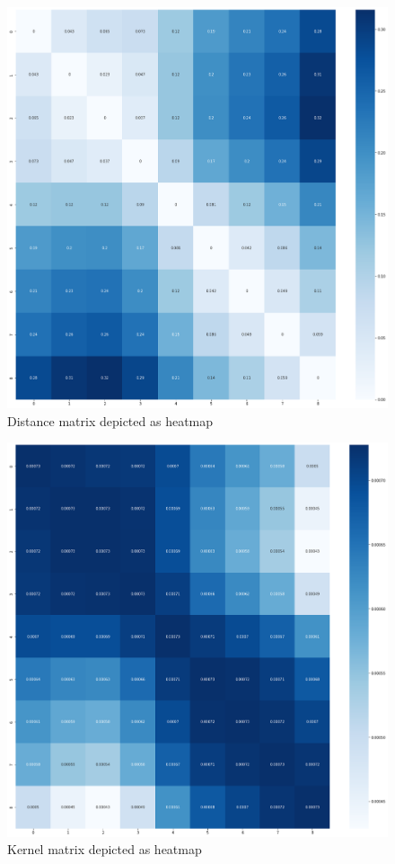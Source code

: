     \begin{figure}
		\centering
		\includegraphics[width=12cm]{images/ordered_D.png}
		\caption{Distance matrix depicted as heatmap}
		\label{fig:ordered set D}
	\end{figure}  
    
    \begin{figure}
    	\centering
    	\includegraphics[width=12cm]{images/ordered_K.png}
    	\caption{Kernel matrix depicted as heatmap}
    	\label{fig:ordered set of K}
    \end{figure}
	
